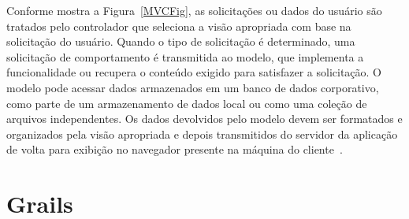 \noindent  Conforme mostra a  Figura~\ref{MVCFig}, as  solicitações ou  dados do
usuário são tratados pelo controlador  que seleciona a visão apropriada com base
na  solicitação do usuário.   Quando o  tipo de  solicitação é  determinado, uma
solicitação  de  comportamento  é   transmitida  ao  modelo,  que  implementa  a
funcionalidade ou recupera  o conteúdo exigido para satisfazer  a solicitação. O
modelo pode  acessar dados  armazenados em um  banco de dados  corporativo, como
parte  de um  armazenamento  de dados  local  ou como  uma  coleção de  arquivos
independentes.   Os  dados  devolvidos   pelo  modelo  devem  ser  formatados  e
organizados pela visão apropriada e depois transmitidos do servidor da aplicação
de    volta   para   exibição    no   navegador    presente   na    máquina   do
cliente~\cite{Pressman11}. 

\section{Grails}

\vspace{0.3cm}

